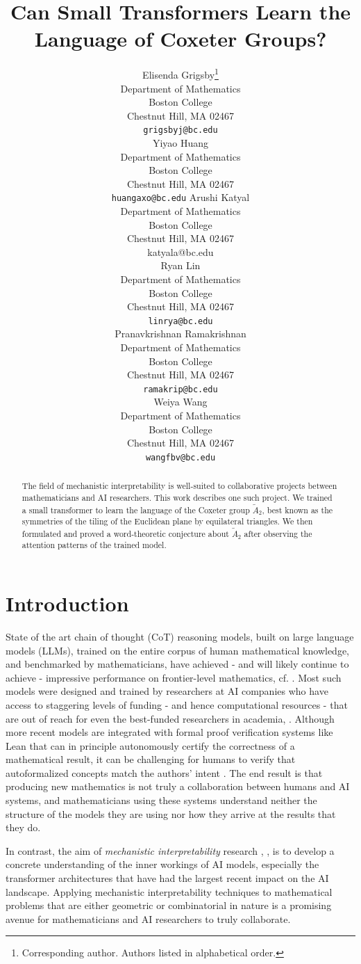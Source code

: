 \documentclass{article}
\title{Can Small Transformers Learn the Language of Coxeter Groups?}
\author{Elisenda Grigsby\thanks{Corresponding author. Authors listed in alphabetical order.
    } \\
  Department of Mathematics\\
  Boston College\\
  Chestnut Hill, MA 02467 \\
  \texttt{grigsbyj@bc.edu} \\
  \And
  Yiyao Huang \\
  Department of Mathematics\\
  Boston College\\
  Chestnut Hill, MA 02467 \\
  \texttt{huangaxo@bc.edu}
   \And
  Arushi Katyal \\
  Department of Mathematics \\ 
  Boston College \\
  Chestnut Hill, MA 02467 \\
  katyala@bc.edu \\
   \And
  Ryan Lin \\
  Department of Mathematics\\
  Boston College\\
  Chestnut Hill, MA 02467 \\
  \texttt{linrya@bc.edu} \\
   \And    
  Pranavkrishnan Ramakrishnan \\
  Department of Mathematics\\
  Boston College\\
  Chestnut Hill, MA 02467 \\
  \texttt{ramakrip@bc.edu} \\
  \And
  Weiya Wang \\
  Department of Mathematics\\
  Boston College\\
  Chestnut Hill, MA 02467 \\
  \texttt{wangfbv@bc.edu}
}
\begin{document}
\maketitle


\begin{abstract}
  The field of mechanistic interpretability is well-suited to collaborative projects between mathematicians and AI researchers. This work describes one such project. We trained a small transformer to learn the language of the Coxeter group $\widetilde{A}_2$, best known as the symmetries of the tiling of the Euclidean plane by equilateral triangles. We then formulated and proved a word-theoretic conjecture about $\widetilde{A}_2$ after observing the attention patterns of the trained model.
\end{abstract}

\section{Introduction}
State of the art chain of thought (CoT) reasoning models, built on large language models (LLMs),  trained on the entire corpus of human mathematical knowledge, and benchmarked by mathematicians, have achieved - and will likely continue to achieve - impressive performance on frontier-level mathematics, cf. \citet{GeorgievGomezSerranoTaoWagner2025, AlexeevBarretoLiLichtmanPriceShahTangTao2026, AlonBloomGowersLittSawinShankarTsimermanWangWood2026}. Most such models were designed and trained by researchers at AI companies who have access to staggering levels of funding - and hence computational resources - that are out of reach for even the best-funded researchers in academia, \citet{Hao2025}. Although more recent models are integrated with formal proof verification systems like Lean that can in principle autonomously certify the correctness of a mathematical result, it can be challenging for humans to verify that autoformalized concepts match the authors' intent \citet{JiangStaatsSzegedyRabeJamnikLiWu2022, LiWuLiWeiZhangYangMa2024, zhang-etal-2025-autoformalization}. The end result is that producing new mathematics is not truly a collaboration between humans and AI systems, and mathematicians using these systems understand neither the structure of the models they are using nor how they arrive at the results that they do.

In contrast, the aim of {\em mechanistic interpretability} research \citet{anthropic2022transformer}, \citet{nanda2022comprehensive}, \citet{SharkeyEtAl2025} is to develop a concrete understanding of the inner workings of AI models, especially the transformer architectures that have had the largest recent impact on the AI landscape. Applying mechanistic interpretability techniques to mathematical problems that are either geometric or combinatorial in nature is a promising avenue for mathematicians and AI researchers to truly collaborate.  
\end{document}
